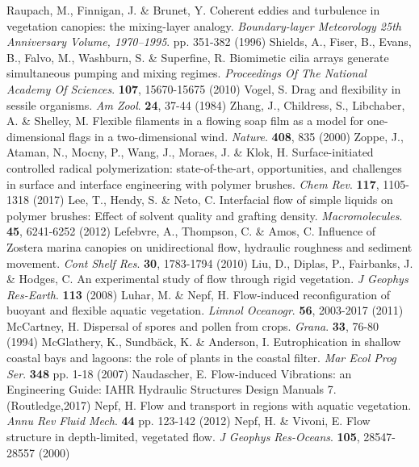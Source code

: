 \documentclass[lineno,authoryear]{FLO_v1}%
\theoremstyle{definition}
\begin{document}
\begin{Backmatter}
\begin{thebibliography}{}
Raupach, M., Finnigan, J. \& Brunet, Y. Coherent eddies and turbulence in vegetation canopies: the mixing-layer analogy. {\em Boundary-layer Meteorology 25th Anniversary Volume, 1970–1995}. pp. 351-382 (1996)
Shields, A., Fiser, B., Evans, B., Falvo, M., Washburn, S. \& Superfine, R. Biomimetic cilia arrays generate simultaneous pumping and mixing regimes. {\em Proceedings Of The National Academy Of Sciences}. \textbf{107}, 15670-15675 (2010)
Vogel, S. Drag and flexibility in sessile organisms. {\em Am Zool}. \textbf{24}, 37-44 (1984)
Zhang, J., Childress, S., Libchaber, A. \& Shelley, M. Flexible filaments in a flowing soap film as a model for one-dimensional flags in a two-dimensional wind. {\em Nature}. \textbf{408}, 835 (2000)
Zoppe, J., Ataman, N., Mocny, P., Wang, J., Moraes, J. \& Klok, H. Surface-initiated controlled radical polymerization: state-of-the-art, opportunities, and challenges in surface and interface engineering with polymer brushes. {\em Chem Rev}. \textbf{117}, 1105-1318 (2017)
Lee, T., Hendy, S. \& Neto, C. Interfacial flow of simple liquids on polymer brushes: Effect of solvent quality and grafting density. {\em Macromolecules}. \textbf{45}, 6241-6252 (2012)
Lefebvre, A., Thompson, C. \& Amos, C. Influence of Zostera marina canopies on unidirectional flow, hydraulic roughness and sediment movement. {\em Cont Shelf Res}. \textbf{30}, 1783-1794 (2010)
Liu, D., Diplas, P., Fairbanks, J. \& Hodges, C. An experimental study of flow through rigid vegetation. {\em J Geophys Res-Earth}. \textbf{113} (2008)
Luhar, M. \& Nepf, H. Flow-induced reconfiguration of buoyant and flexible aquatic vegetation. {\em Limnol Oceanogr}. \textbf{56}, 2003-2017 (2011)
McCartney, H. Dispersal of spores and pollen from crops. {\em Grana}. \textbf{33}, 76-80 (1994)
McGlathery, K., Sundbäck, K. \& Anderson, I. Eutrophication in shallow coastal bays and lagoons: the role of plants in the coastal filter. {\em Mar Ecol Prog Ser}. \textbf{348} pp. 1-18 (2007)
Naudascher, E. Flow-induced Vibrations: an Engineering Guide: IAHR Hydraulic Structures Design Manuals 7. (Routledge,2017)
Nepf, H. Flow and transport in regions with aquatic vegetation. {\em Annu Rev Fluid Mech}. \textbf{44} pp. 123-142 (2012)
Nepf, H. \& Vivoni, E. Flow structure in depth-limited, vegetated flow. {\em J Geophys Res-Oceans}. \textbf{105}, 28547-28557 (2000)

\end{thebibliography}
\end{Backmatter}
\end{document}
